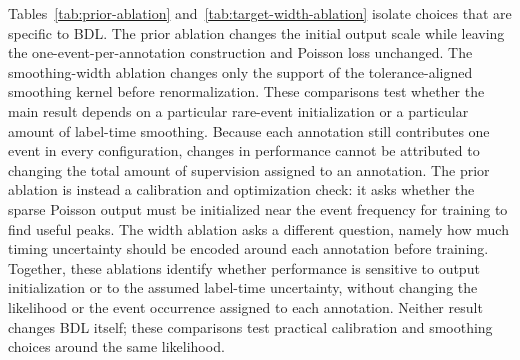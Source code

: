 Tables~\ref{tab:prior-ablation} and~\ref{tab:target-width-ablation} isolate choices that are specific to BDL.
The prior ablation changes the initial output scale while leaving the one-event-per-annotation construction and Poisson loss unchanged.
The smoothing-width ablation changes only the support of the tolerance-aligned smoothing kernel before renormalization.
These comparisons test whether the main result depends on a particular rare-event initialization or a particular amount of label-time smoothing.
Because each annotation still contributes one event in every configuration, changes in performance cannot be attributed to changing the total amount of supervision assigned to an annotation.
The prior ablation is instead a calibration and optimization check: it asks whether the sparse Poisson output must be initialized near the event frequency for training to find useful peaks.
The width ablation asks a different question, namely how much timing uncertainty should be encoded around each annotation before training.
Together, these ablations identify whether performance is sensitive to output initialization or to the assumed label-time uncertainty, without changing the likelihood or the event occurrence assigned to each annotation.
Neither result changes BDL itself; these comparisons test practical calibration and smoothing choices around the same likelihood.

